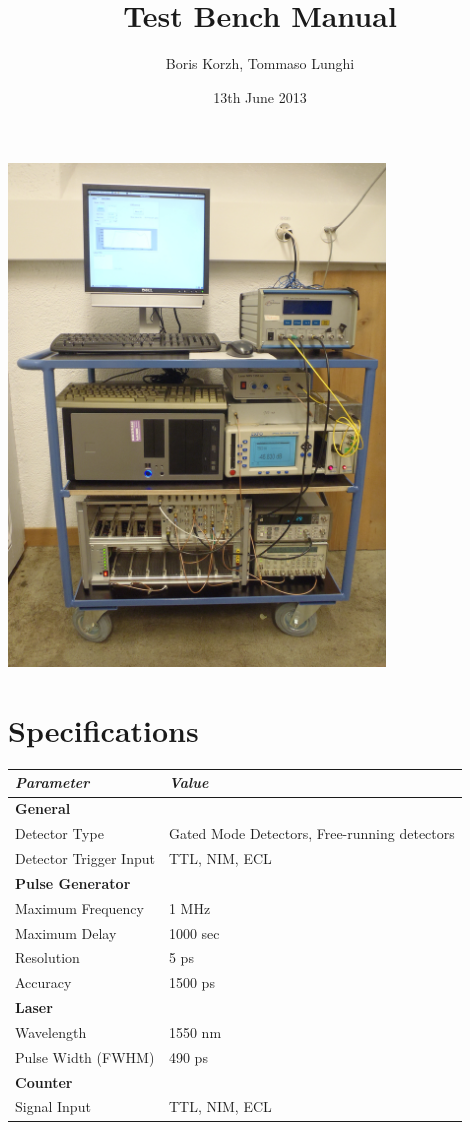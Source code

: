 \documentclass{article}
\title{Test Bench Manual}
\author{Boris Korzh, Tommaso Lunghi}
\date{13th June 2013}
\begin{document}
\maketitle
\begin{center}
\includegraphics[width=10cm]{images/testbench1.JPG}
\end{center}


\section{Specifications}
\begin{center}
\begin{tabular}{ | l | l |  }
\hline
\emph{Parameter} & \emph{Value} \\ \hline
{\bf General } &   \\ \hline
Detector Type & Gated Mode Detectors, Free-running detectors \\ \hline
Detector Trigger Input & TTL, NIM, ECL \\ \hline

{\bf Pulse Generator } &   \\ \hline
Maximum Frequency & 1 MHz  \\ \hline
Maximum Delay & 1000 sec  \\ \hline
Resolution & 5 ps  \\ \hline
Accuracy & 1500 ps  \\ \hline

\bf{Laser} & \\ \hline
Wavelength & 1550 nm \\ \hline
Pulse Width (FWHM) & 490 ps \\ \hline
\bf{Counter} & \\ \hline

Signal Input & TTL, NIM, ECL \\ \hline
\end{tabular}
\end{center}
\end{document}
